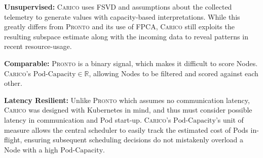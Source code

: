 \textbf{Unsupervised:} \textsc{Carico} uses FSVD and assumptions about the
collected telemetry to generate values with capacity-based interpretations.
While this greatly differs from \textsc{Pronto} and its use of FPCA,
\textsc{Carico} still exploits the resulting subspace estimate along with the
incoming data to reveal patterns in recent resource-usage.

\textbf{Comparable:} \textsc{Pronto} is a binary signal, which makes it
difficult to score Nodes. \textsc{Carico}'s $\text{Pod-Capacity} \in
\mathbb{R}$, allowing Nodes to be filtered and scored against each other.

\textbf{Latency Resilient:} Unlike \textsc{Pronto} which assumes no communication
latency, \textsc{Carico} was designed with Kubernetes in mind, and thus must consider
possible latency in communication and Pod start-up. \textsc{Carico}'s
$\text{Pod-Capacity}$'s unit of measure allows the central scheduler to easily
track the estimated cost of Pods in-flight, ensuring subsequent scheduling
decisions do not mistakenly overload a Node with a high $\text{Pod-Capacity}$.
%
%
%
%

